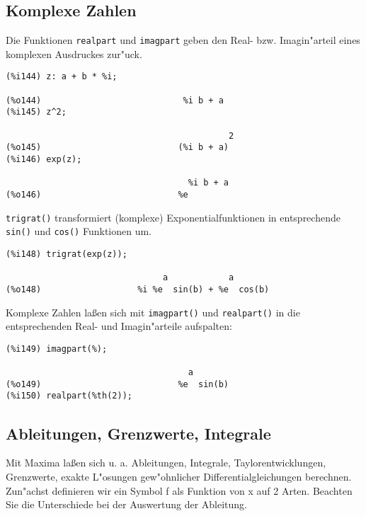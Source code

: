 \documentclass[spanish,12pt,a4paper]{article}
\begin{document}
\subsection{Komplexe Zahlen}


Die Funktionen \verb|realpart| und \verb|imagpart| geben den Real- bzw. Imagin"arteil eines komplexen Ausdruckes zur"uck.

\scriptsize
\begin{verbatim}
(%i144) z: a + b * %i;

(%o144)                            %i b + a
(%i145) z^2;

                                            2
(%o145)                           (%i b + a)
(%i146) exp(z);

                                    %i b + a
(%o146)                           %e
\end{verbatim}
\normalsize

\verb|trigrat()| transformiert (komplexe) Exponentialfunktionen in entsprechende \verb|sin()| und \verb|cos()| Funktionen um.

\scriptsize
\begin{verbatim}
(%i148) trigrat(exp(z));

                               a            a
(%o148)                   %i %e  sin(b) + %e  cos(b)
\end{verbatim}
\normalsize

Komplexe Zahlen la{\ss}en sich mit \verb|imagpart()| und \verb|realpart()| in die entsprechenden Real- und Imagin"arteile aufspalten:

\scriptsize
\begin{verbatim}
(%i149) imagpart(%);

                                    a
(%o149)                           %e  sin(b)
(%i150) realpart(%th(2));
\end{verbatim}
\normalsize


\subsection{Ableitungen, Grenzwerte, Integrale}


Mit Maxima la{\ss}en sich u. a. Ableitungen, Integrale, Taylorentwicklungen, Grenzwerte, exakte L"osungen gew"ohnlicher Differentialgleichungen berechnen.
Zun"achst definieren wir ein Symbol f als Funktion von x auf 2 Arten. Beachten Sie die Unterschiede bei der Auswertung der Ableitung.
\end{document}
